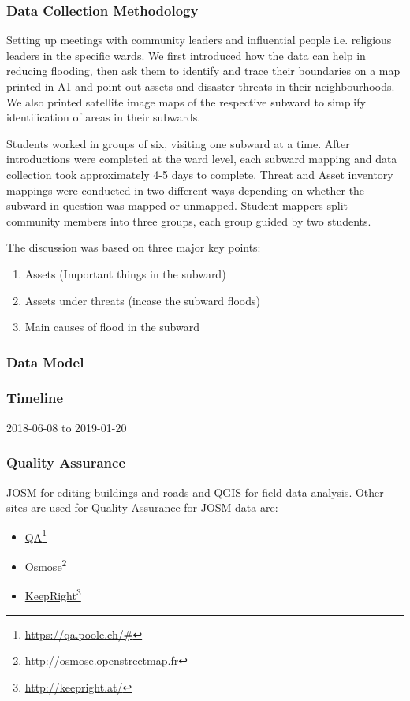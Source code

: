 \documentclass[a4paper,12pt,twoside]{article}
\begin{document}
\subsubsection{Data Collection Methodology}

Setting up meetings with community leaders and influential people i.e. religious leaders in the specific wards. We first introduced how the data can help in reducing flooding, then ask them to identify and trace their boundaries on a map printed in A1 and point out assets and disaster threats in their neighbourhoods. We also printed satellite image maps of the respective subward to simplify identification of areas in their subwards.

Students worked in groups of six, visiting one subward at a time. After introductions were completed at the ward level, each subward mapping and data collection took approximately  4-5 days to complete. Threat and Asset inventory mappings were conducted in two different ways depending on whether the subward in question was mapped or unmapped. Student mappers split community members into three groups, each group guided by two students.

The discussion was based on three major key points:
\begin{enumerate}
    \item Assets (Important things in the subward)
    \item Assets under threats (incase the subward floods)
    \item Main causes of flood in the subward
\end{enumerate}

\subsubsection{Data Model}

\subsubsection{Timeline}
2018-06-08 to 2019-01-20

\subsubsection{Quality Assurance}
JOSM for editing buildings and roads and QGIS for field data analysis. Other sites are used for Quality Assurance for JOSM data are:
\begin{itemize}
    \item \href{https://qa.poole.ch/#}{QA}\footnote{\url{https://qa.poole.ch/#}}
    \item \href{http://osmose.openstreetmap.fr}{Osmose}\footnote{\url{http://osmose.openstreetmap.fr}}
    \item \href{http://keepright.at/}{KeepRight}\footnote{\url{http://keepright.at/}}
\end{itemize}
\end{document}
